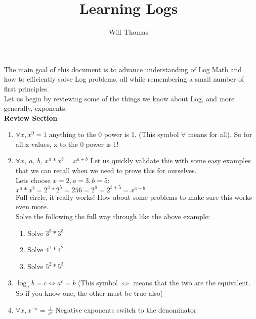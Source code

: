 \documentclass[11pt]{article}
\title{Learning Logs}
\author{Will Thomas}
\begin{document}
\maketitle
The main goal of this document is to advance understanding of Log Math and how to efficiently solve Log problems, all while remembering a small number of first principles. \\
Let us begin by reviewing some of the things we know about Log, and more generally, exponents.
\\
\textbf{Review Section}
\begin{enumerate}
    \item $\forall x, x^0 = 1$ anything to the 0 power is 1. (This symbol $\forall$ means for all). So for all x values, x to the 0 power is 1! 
    \item $\forall x, \ a, \ b, \ x^a * x^b = x^{a+b}$ Let us quickly validate this with some easy examples that we can recall when we need to prove this for ourselves. \\
        Lets choose $x = 2, a = 3, b = 5$: \\
        $x^a * x^b = 2^3 * 2^5 = 256 = 2^8 = 2^{3+5} = x^{a+b}$ \\
        Full circle, it really works!
        How about some problems to make sure this works even more. \\
        Solve the following the full way through like the above example:
        \begin{enumerate}
            \item Solve $3^5 * 3^3$
            \item Solve $4^1 * 4^2$
            \item Solve $5^2 * 5^3$
        \end{enumerate}
    \item $\log_{a}{b} = c \iff a^c = b$ (This symbol $\iff$ means that the two are the equivalent. So if you know one, the other must be true also)
    \item $\forall x, x^{-a} = \frac{1}{x^{a}}$ Negative exponents switch to the denominator
\end{enumerate}
\end{document}
